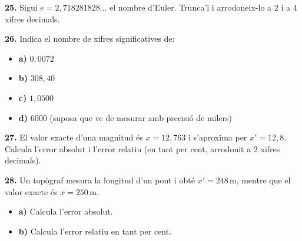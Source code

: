 \documentclass[13pt,a4paper]{extarticle}
\begin{document}
\par\noindent\begin{minipage}{\linewidth}
\textbf{25.} Sigui $e=2{,}718281828\ldots$ el nombre d'Euler. Trunca'l i arrodoneix-lo a $2$ i a $4$ xifres decimals.\par
\end{minipage}\par\vspace{1.6mm}
\par\noindent\begin{minipage}{\linewidth}
\textbf{26.} Indica el nombre de xifres significatives de:\par

\begin{itemize}[leftmargin=0pt,itemsep=3pt,topsep=3pt,parsep=0pt,label={}]
\item \textbf{a)} $0{,}0072$
\item \textbf{b)} $308{,}40$
\item \textbf{c)} $1{,}0500$
\item \textbf{d)} $6000$ (suposa que ve de mesurar amb precisió de milers)
\end{itemize}
\end{minipage}\par\vspace{1.6mm}
\par\noindent\begin{minipage}{\linewidth}
\textbf{27.} El valor exacte d'una magnitud és $x=12{,}763$ i s'aproxima per $x'=12{,}8$. Calcula l'error absolut i l'error relatiu (en tant per cent, arrodonit a $2$ xifres decimals).\par
\end{minipage}\par\vspace{1.6mm}
\par\noindent\begin{minipage}{\linewidth}
\textbf{28.} Un topògraf mesura la longitud d'un pont i obté $x'=248\,\text{m}$, mentre que el valor exacte és $x=250\,\text{m}$.\par

\begin{itemize}[leftmargin=0pt,itemsep=3pt,topsep=3pt,parsep=0pt,label={}]
\item \textbf{a)} Calcula l'error absolut.
\item \textbf{b)} Calcula l'error relatiu en tant per cent.
\end{itemize}
\end{minipage}\par\vspace{1.6mm}
\end{document}
